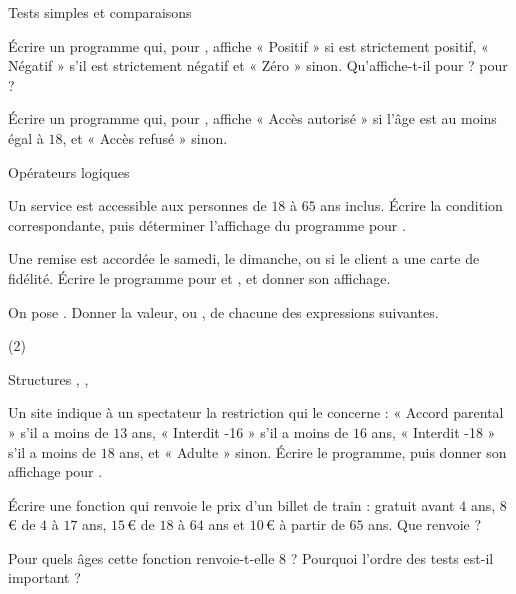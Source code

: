 \exercices
{}

\begin{exercice}[1]{Tests simples et comparaisons}
\begin{questions}
  \item Écrire un programme qui, pour , affiche « Positif » si  est strictement positif, « Négatif » s'il est
    strictement négatif et « Zéro » sinon. Qu'affiche-t-il pour  ? pour  ?
  \item Écrire un programme qui, pour , affiche « Accès autorisé » si l'âge est au moins égal à $18$, et
    « Accès refusé » sinon.
\end{questions}
\end{exercice}

\begin{exercice}[1]{Opérateurs logiques}
\begin{questions}
  \item Un service est accessible aux personnes de $18$ à $65$ ans inclus. Écrire la condition correspondante, puis déterminer
    l'affichage du programme pour .
  \item Une remise est accordée le samedi, le dimanche, ou si le client a une carte de fidélité. Écrire le programme pour
     et , et donner son affichage.
  \item On pose . Donner la valeur,  ou , de chacune des expressions suivantes.
\begin{tasks}[label=\alph*)](2)
  \task {}
  \task {}
  \task {}
  \task {}
\end{tasks}
\end{questions}
\end{exercice}


\begin{exercice}[2]{Structures , , }
\begin{questions}
  \item Un site indique à un spectateur la restriction qui le concerne : « Accord parental » s'il a moins de $13$ ans,
    « Interdit -16 » s'il a moins de $16$ ans, « Interdit -18 » s'il a moins de $18$ ans, et « Adulte » sinon. Écrire le programme,
    puis donner son affichage pour .
  \item Écrire une fonction  qui renvoie le prix d'un billet de train : gratuit avant $4$ ans, $8$\,€ de $4$
    à $17$ ans, $15$\,€ de $18$ à $64$ ans et $10$\,€ à partir de $65$ ans. Que renvoie  ?
  \item Pour quels âges cette fonction renvoie-t-elle $8$ ? Pourquoi l'ordre des tests est-il important ?
\end{questions}
\end{exercice}

